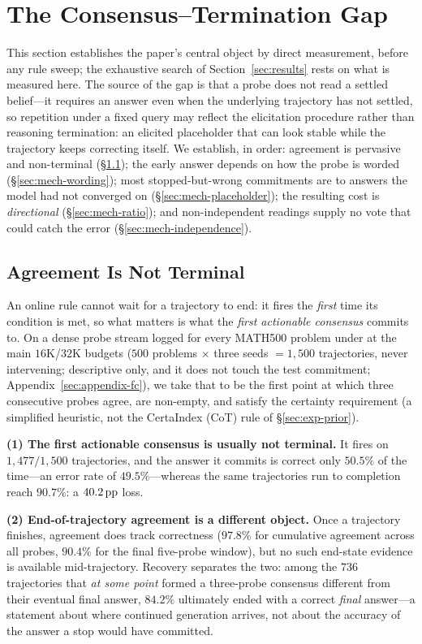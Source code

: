 \section{The Consensus--Termination Gap}
\label{sec:mechanism}

This section establishes the paper's central object by direct measurement,
before any rule sweep; the exhaustive search of Section~\ref{sec:results} rests
on what is measured here. The source of the gap is that a probe does not read a
settled belief---it requires an answer even when the underlying trajectory has
not settled, so repetition under a fixed query may reflect the elicitation
procedure rather than reasoning termination: an elicited placeholder that can
look stable while the trajectory keeps correcting itself. We establish, in
order: agreement is pervasive and non-terminal (\S\ref{sec:exp-fc}); the early
answer depends on how the probe is worded (\S\ref{sec:mech-wording}); most
stopped-but-wrong commitments are to answers the model had not converged on
(\S\ref{sec:mech-placeholder}); the resulting cost is \emph{directional}
(\S\ref{sec:mech-ratio}); and non-independent readings supply no vote that could
catch the error (\S\ref{sec:mech-independence}).

\subsection{Agreement Is Not Terminal}
\label{sec:exp-fc}
An online rule cannot wait for a trajectory to end: it fires the \emph{first}
time its condition is met, so what matters is what the \emph{first actionable
consensus} commits to. On a dense probe stream logged for every \textsc{MATH}500
problem under \dsseven{} at the main $16$K/$32$K budgets ($500$ problems $\times$
three seeds $=1{,}500$ trajectories, never intervening; descriptive only, and it
does not touch the test commitment; Appendix~\ref{sec:appendix-fc}), we take
that to be the first point at which
three consecutive probes agree, are non-empty, and satisfy the certainty
requirement (a simplified heuristic, not the CertaIndex (CoT) rule of
\S\ref{sec:exp-prior}).

\textbf{(1) The first actionable consensus is usually not terminal.} It fires on
$1{,}477/1{,}500$ trajectories, and the answer it commits is correct only
$50.5\%$ of the time---an error rate of $49.5\%$---whereas the same trajectories
run to completion reach $90.7\%$: a $40.2\,\text{pp}$ loss.

\textbf{(2) End-of-trajectory agreement is a different object.} Once a
trajectory finishes, agreement does track correctness ($97.8\%$ for cumulative
agreement across all probes, $90.4\%$ for the final five-probe window), but no
such end-state evidence is available mid-trajectory. Recovery separates the two:
among the $736$ trajectories that \emph{at some point} formed a three-probe
consensus different from their eventual final answer, $84.2\%$ ultimately ended
with a correct \emph{final} answer---a statement about where continued
generation arrives, not about the accuracy of the answer a stop would have
committed.

